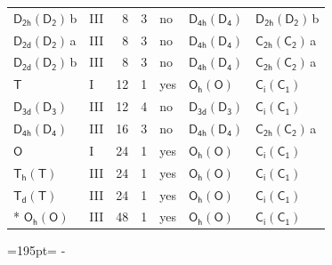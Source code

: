 \documentclass[10pt,a4paper]{article}
\newcommand{\needspace}[1]{\par\penalty-100\begingroup\dimen0=#1\relax\dimen2=\pagegoal
  \advance\dimen2-\pagetotal\ifdim\dimen0>\dimen2\relax\ifdim\dimen2>0pt\vfil\break\fi\fi
  \endgroup}
\numberwithin{equation}{section}
\newcommand{\grp}[1]{\mathsf{#1}}
\newcommand{\clsletter}[1]{\,{\scriptsize\color{black!55}#1}}
\begin{document}
{\begin{longtable}{@{}llrrlll@{}}
\href{D2h-D2.pdf}{$\grp{D_{2h}}(\grp{D_{2}})$}\clsletter{b} & III & 8 & 3 & no & \href{D4h-D4.pdf}{$\grp{D_{4h}}(\grp{D_{4}})$} & \href{D2h-D2.pdf}{$\grp{D_{2h}}(\grp{D_{2}})$}\clsletter{b}\\
\href{D2d-D2.pdf}{$\grp{D_{2d}}(\grp{D_{2}})$}\clsletter{a} & III & 8 & 3 & no & \href{D4h-D4.pdf}{$\grp{D_{4h}}(\grp{D_{4}})$} & \href{C2h-C2.pdf}{$\grp{C_{2h}}(\grp{C_{2}})$}\clsletter{a}\\
\href{D2d-D2.pdf}{$\grp{D_{2d}}(\grp{D_{2}})$}\clsletter{b} & III & 8 & 3 & no & \href{D4h-D4.pdf}{$\grp{D_{4h}}(\grp{D_{4}})$} & \href{C2h-C2.pdf}{$\grp{C_{2h}}(\grp{C_{2}})$}\clsletter{a}\\
\href{../../../rotation/data/pdf/T.pdf}{$\grp{T}$} & I & 12 & 1 & yes & \href{Oh-O.pdf}{$\grp{O_{h}}(\grp{O})$} & \href{S2-C1.pdf}{$\grp{C_{i}}(\grp{C_{1}})$}\\
\href{D3d-D3.pdf}{$\grp{D_{3d}}(\grp{D_{3}})$} & III & 12 & 4 & no & \href{D3d-D3.pdf}{$\grp{D_{3d}}(\grp{D_{3}})$} & \href{S2-C1.pdf}{$\grp{C_{i}}(\grp{C_{1}})$}\\
\href{D4h-D4.pdf}{$\grp{D_{4h}}(\grp{D_{4}})$} & III & 16 & 3 & no & \href{D4h-D4.pdf}{$\grp{D_{4h}}(\grp{D_{4}})$} & \href{C2h-C2.pdf}{$\grp{C_{2h}}(\grp{C_{2}})$}\clsletter{a}\\
\href{../../../rotation/data/pdf/O.pdf}{$\grp{O}$} & I & 24 & 1 & yes & \href{Oh-O.pdf}{$\grp{O_{h}}(\grp{O})$} & \href{S2-C1.pdf}{$\grp{C_{i}}(\grp{C_{1}})$}\\
\href{Th-T.pdf}{$\grp{T_{h}}(\grp{T})$} & III & 24 & 1 & yes & \href{Oh-O.pdf}{$\grp{O_{h}}(\grp{O})$} & \href{S2-C1.pdf}{$\grp{C_{i}}(\grp{C_{1}})$}\\
\href{Td-T.pdf}{$\grp{T_{d}}(\grp{T})$} & III & 24 & 1 & yes & \href{Oh-O.pdf}{$\grp{O_{h}}(\grp{O})$} & \href{S2-C1.pdf}{$\grp{C_{i}}(\grp{C_{1}})$}\\*
\href{Oh-O.pdf}{$\grp{O_{h}}(\grp{O})$} & III & 48 & 1 & yes & \href{Oh-O.pdf}{$\grp{O_{h}}(\grp{O})$} & \href{S2-C1.pdf}{$\grp{C_{i}}(\grp{C_{1}})$}\\
\bottomrule\end{longtable}}
\needspace{195pt}
\end{document}
